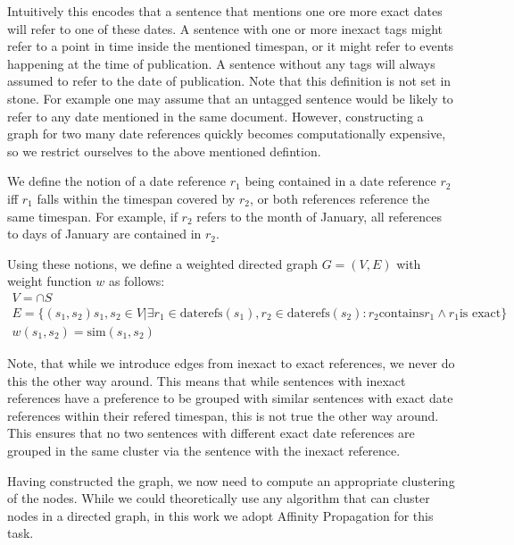 \documentclass[a4paper,BCOR=10mm]{report}
\begin{document}
Intuitively this encodes that a sentence that mentions one ore more exact dates will refer to one of these dates. A sentence with one or more inexact tags might refer to a point in time inside the mentioned timespan, or it might refer to events happening at the time of publication. A sentence without any tags will always assumed to refer to the date of publication.
Note that this definition is not set in stone. For example one may assume that an untagged sentence would be likely to refer to any date mentioned in the same document. However, constructing a graph for two many date references quickly becomes computationally expensive, so we restrict ourselves to the above mentioned defintion.

We define the notion of a date reference $r_1$ being contained in a date reference $r_2$ iff $r_1$ falls within the timespan covered by $r_2$, or both references reference the same timespan. For example, if $r_2$ refers to the month of January, all references to days of January are contained in $r_2$.

Using these notions, we define a weighted directed graph $G = (V, E)$ with weight function $w$ as follows:
\begin{align*}
V = \cap{S} \\
E = \{ (s_1, s_2) s_1, s_2 \in V | \exists r_1 \in \text{daterefs}(s_1), r_2 \in \text{daterefs}(s_2): r_2 \text{contains} r_1 \land r_1 \text{is exact} \} \\ %
w(s_1, s_2) = \text{sim}(s_1, s_2)
\end{align*}


Note, that while we introduce edges from inexact to exact references, we never do this the other way around. This means that while sentences with inexact references have a preference to be grouped with similar sentences with exact date references within their refered timespan, this is not true the other way around.
This ensures that no two sentences with different exact date references are grouped in the same cluster via the sentence with the inexact reference.

Having constructed the graph, we now need to compute an appropriate clustering of the nodes. While we could theoretically use any algorithm that can cluster nodes in a directed graph, in this work we adopt Affinity Propagation for this task.
\end{document}

